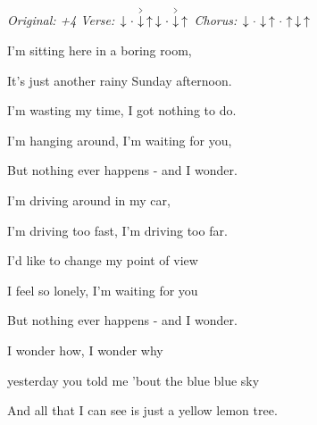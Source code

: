 \begin{song}


\begin{headerbox}
\RaiseBoxWithAccents
\textit{Original: +4} \quad
\textit{Verse:} $\Down\Miss\AccentDown\Up \Down\Miss\AccentDown\Up$ \quad
\textit{Chorus:} $\Down\Miss\Down\Up\Miss\Up\Down\Up$
\end{headerbox}

\begin{hchordbox}
\end{hchordbox}


\bigskip

I'm sitting here in a boring room, \par
It's just another rainy Sunday afternoon. \par
I'm wasting my time, I got nothing to do. \par
I'm hanging around, I'm waiting for you, \par
But nothing ever happens -  and I wonder.   \par

\bigskip

I'm driving around in my car, \par
I'm driving too fast, I'm driving too far. \par
I'd like to change my point of view \par
I feel so lonely, I'm waiting for you \par
But nothing ever happens -  and I wonder.   \par

\bigskip

\begin{chorusbox}{\Chorus}
I wonder how, I wonder why \par
{}yesterday you told me 'bout the blue blue sky \par
And all that I can see is just a yellow lemon tree.  \par


\end{chorusbox}
\end{song}
